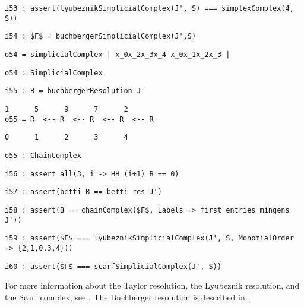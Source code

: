 \documentclass[12pt,leqno]{amsart}
\theoremstyle{definition}
\begin{document}
\begin{lstlisting}[xleftmargin=10pt, aboveskip=1.5pt, belowskip=1.5pt]
i53 : assert(lyubeznikSimplicialComplex(J', S) === simplexComplex(4, S))
\end{lstlisting}
\begin{lstlisting}[xleftmargin=10pt, aboveskip=1.5pt, belowskip=1.5pt]
i54 : $Γ$ = buchbergerSimplicialComplex(J',S)
\end{lstlisting}
\begin{lstlisting}[xleftmargin=10pt, aboveskip=1.5pt, belowskip=1.5pt]
o54 = simplicialComplex | x_0x_2x_3x_4 x_0x_1x_2x_3 |
\end{lstlisting}
\begin{lstlisting}[xleftmargin=10pt, aboveskip=1.5pt, belowskip=1.5pt]
o54 : SimplicialComplex
\end{lstlisting}
\begin{lstlisting}[xleftmargin=10pt, aboveskip=1.5pt, belowskip=1.5pt]
i55 : B = buchbergerResolution J'
\end{lstlisting}
\begin{lstlisting}[xleftmargin=10pt, lineskip=-10pt, aboveskip=1.5pt, belowskip=1.5pt]
       1      5      9      7      2
o55 = R  <-- R  <-- R  <-- R  <-- R
\end{lstlisting}
\begin{lstlisting}[xleftmargin=10pt, aboveskip=1.5pt, belowskip=1.5pt]
      0      1      2      3      4
\end{lstlisting}
\begin{lstlisting}[xleftmargin=10pt, aboveskip=1.5pt, belowskip=1.5pt]
o55 : ChainComplex
\end{lstlisting}
\begin{lstlisting}[xleftmargin=10pt, aboveskip=1.5pt, belowskip=1.5pt]
i56 : assert all(3, i -> HH_(i+1) B == 0) 
\end{lstlisting}
\begin{lstlisting}[xleftmargin=10pt, aboveskip=1.5pt, belowskip=1.5pt]
i57 : assert(betti B == betti res J')
\end{lstlisting}
\begin{lstlisting}[xleftmargin=10pt, aboveskip=1.5pt, belowskip=1.5pt]
i58 : assert(B == chainComplex($Γ$, Labels => first entries mingens J'))
\end{lstlisting}
\begin{lstlisting}[xleftmargin=10pt, aboveskip=1.5pt, belowskip=1.5pt]
i59 : assert($Γ$ === lyubeznikSimplicialComplex(J', S, MonomialOrder => {2,1,0,3,4}))
\end{lstlisting}
\begin{lstlisting}[xleftmargin=10pt, aboveskip=1.5pt, belowskip=3.0pt]
i60 : assert($Γ$ === scarfSimplicialComplex(J', S))
\end{lstlisting}
For more information about the Taylor resolution, the Lyubeznik resolution,
and the Scarf complex, see \cite{Mermin}.  The Buchberger resolution is
described in \cite{OW}.  \vfill
\end{document}
